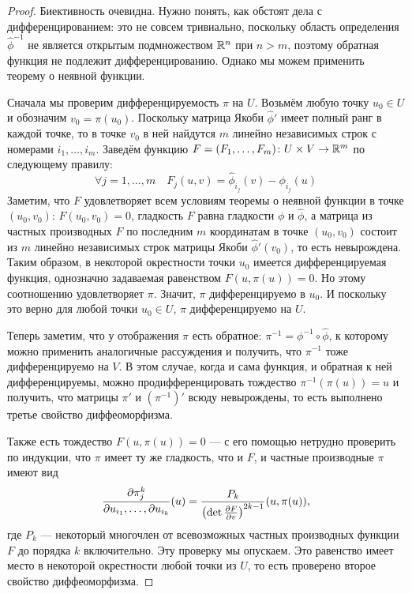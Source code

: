 \begin{proof}
	Биективность очевидна. Нужно понять, как обстоят дела с дифференцированием: это не совсем тривиально, поскольку область определения $\hat\phi^{-1}$ не является открытым подмножеством $\mathbb{R}^n$ при $n > m$, поэтому обратная функция не подлежит дифференцированию. Однако мы можем применить теорему о неявной функции. 
	
	Сначала мы проверим дифференцируемость $\pi$ на $U$. Возьмём любую точку $u_0 \in U$ и обозначим $v_0 = \pi(u_0)$. Поскольку матрица Якоби $\hat\phi'$ имеет полный ранг в каждой точке, то в точке $v_0$ в ней найдутся $m$ линейно независимых строк с номерами $i_1, \ldots, i_m$. Заведём функцию $F = (F_1, \ldots, F_m) \colon U \times V \to \mathbb{R}^m$ по следующему правилу:
	\[
		\forall j = 1, \ldots, m \quad F_j(u, v) = \hat\phi_{i_j}(v) - \phi_{i_j}(u)
	\]
	Заметим, что $F$ удовлетворяет всем условиям теоремы о неявной функции в точке $(u_0, v_0)$: $F(u_0, v_0) = 0$, гладкость $F$ равна гладкости $\phi$ и $\hat\phi$, а матрица из частных производных $F$ по последним $m$ координатам в точке $(u_0, v_0)$ состоит из $m$ линейно независимых строк матрицы Якоби $\hat\phi'(v_0)$, то есть невырождена. Таким образом, в некоторой окрестности точки $u_0$ имеется дифференцируемая функция, однозначно задаваемая равенством $F(u, \pi(u)) = 0$. Но этому соотношению удовлетворяет $\pi$. Значит, $\pi$ дифференцируемо в $u_0$. И поскольку это верно для любой точки $u_0 \in U$, $\pi$ дифференцируемо на $U$.
	
	Теперь заметим, что у отображения $\pi$ есть обратное: $\pi^{-1} = \phi^{-1}\circ\hat\phi$, к которому можно применить аналогичные рассуждения и получить, что $\pi^{-1}$ тоже дифференцируемо на $V$. В этом случае, когда и сама функция, и обратная к ней дифференцируемы, можно продифференцировать тождество $\pi^{-1}(\pi(u)) = u$ и получить, что матрицы $\pi'$ и $(\pi^{-1})'$ всюду невырождены, то есть выполнено третье свойство диффеоморфизма.
	
	Также есть тождество $F(u, \pi(u)) = 0$ --- с его помощью нетрудно проверить по индукции, что $\pi$ имеет ту же гладкость, что и $F$, и частные производные $\pi$ имеют вид
	\[
		\frac{\partial \pi_j^k}{\partial u_{i_1}, \ldots, \partial u_{i_k}}(u) = \frac{P_k}{\left(\det \frac{\partial F}{\partial v}\right)^{2k-1}}(u, \pi(u)),
	\]
	где $P_k$ --- некоторый многочлен от всевозможных частных производных функции $F$ до порядка $k$ включительно. Эту проверку мы опускаем. Это равенство имеет место в некоторой окрестности любой точки из $U$, то есть проверено второе свойство диффеоморфизма. 
	
\end{proof}

